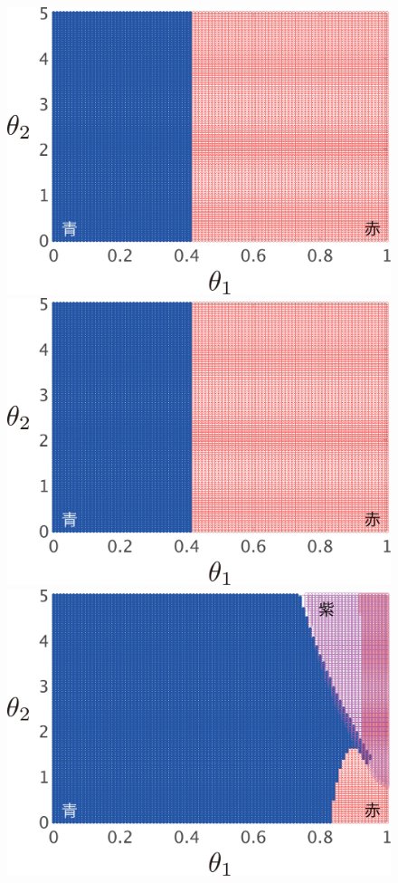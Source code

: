 \documentclass[tombow,dvipdfmx]{corona-a5-1.1}
\begin{document}
\begin{figure}[t!]
  \centering
  {
  \begin{minipage}{0.49\linewidth}
    \centering
    \includegraphics[width = 0.90\linewidth]{figs/Y1D1X}
    \medskip
  \end{minipage}
  \begin{minipage}{0.49\linewidth}
    \centering
    \includegraphics[width = 0.90\linewidth]{figs/Y1D0.01X}
    \medskip
  \end{minipage}
}
  \centering
  {
  \begin{minipage}{0.49\linewidth}
      \centering
    \includegraphics[width = 0.90\linewidth]{figs/Y0.01D1X}

\end{minipage}}
\end{figure}
\end{document}
